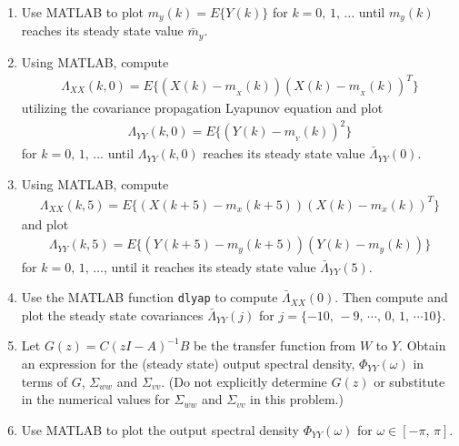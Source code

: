 \begin{enumerate}
    \item
    Use MATLAB to  plot $m_y(k) = E\{Y(k) \}$ for $k=0,\,1,\,\ldots$ until $m_y(k)$ reaches its steady state value $\bar m_y$.

    \item
    Using MATLAB, compute
    \begin{align*}
        \Lambda_{XX}(k,0) = E\{ (X(k) - m_{_X}(k))(X(k) - m_{_X}(k))^T\}
    \end{align*}
    utilizing the covariance propagation Lyapunov equation and plot
    \begin{align*}
        \Lambda_{YY}(k,0) = E\{(Y(k)-m_{_{Y}}(k))^2 \}
    \end{align*}
    for $k=0,\,1,\,\ldots$ until $\Lambda_{YY}(k,0)$ reaches its steady state value $\bar \Lambda_{YY}(0)$.

    \item
    Using MATLAB, compute
    \begin{align*}
        \Lambda_{XX}(k,5) = E\{ (X(k+5) - m_x(k+5))(X(k) - m_x(k))^T\}
    \end{align*}
    and plot
    \begin{align*}
        \Lambda_{YY}(k,5) = E\{(Y(k+5)-m_y(k+5))(Y(k)-m_y(k)) \}
    \end{align*}
    for $k=0,\,1,\,\ldots$, until it reaches its steady state value $\bar \Lambda_{YY}(5)$.

    \item
    Use the MATLAB function {\tt dlyap} to compute $\bar \Lambda_{XX}(0)$. Then compute and plot the steady state covariances $\bar \Lambda_{YY}(j)$ for $j=\{-10,\,-9,\, \cdots,\, 0,\, 1,\,\cdots 10\}$.

    \item
    Let $G(z) = C (z I - A)^{-1} B$ be the transfer function from $W$ to $Y$.
    Obtain an expression for the (steady state) output spectral density,  $\Phi_{YY}(\omega)$ in terms of $G$, $\Sigma_{ww}$ and $\Sigma_{vv}$. (Do not explicitly determine $G(z)$ or substitute in the numerical values for $\Sigma_{ww}$ and $\Sigma_{vv}$ in this problem.)

    \item
    Use MATLAB to plot the output spectral density $\Phi_{YY}(\omega)$ for $\omega \in [-\pi,\,\pi]$.

\end{enumerate}




